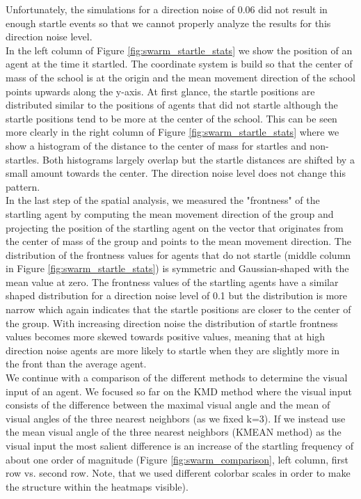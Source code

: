     Unfortunately, the simulations for a direction noise of 0.06 did not result in enough startle events so that we cannot properly analyze the results for this direction noise level.\\
    In the left column of Figure \ref{fig:swarm_startle_stats} we show the position of an agent at the time it startled.
    The coordinate system is build so that the center of mass of the school is at the origin and the mean movement direction of the school points upwards along the y-axis.
    At first glance, the startle positions are distributed similar to the positions of agents that did not startle although the startle positions tend to be more at the center of the school.
    This can be seen more clearly in the right column of Figure \ref{fig:swarm_startle_stats} where we show a histogram of the distance to the center of mass for startles and non-startles.
    Both histograms largely overlap but the startle distances are shifted by a small amount towards the center.
    The direction noise level does not change this pattern.\\
    In the last step of the spatial analysis, we measured the "frontness" of the startling agent by computing the mean movement direction of the group and projecting the position of the startling agent on the vector that originates from the center of mass of the group and points to the mean movement direction.
    The distribution of the frontness values for agents that do not startle (middle column in Figure \ref{fig:swarm_startle_stats}) is symmetric and Gaussian-shaped with the mean value at zero.
    The frontness values of the startling agents have a similar shaped distribution for a direction noise level of 0.1 but the distribution is more narrow which again indicates that the startle positions are closer to the center of the group.
    With increasing direction noise the distribution of startle frontness values becomes more skewed towards positive values, meaning that at high direction noise agents are more likely to startle when they are slightly more in the front than the average agent.\\
    We continue with a comparison of the different methods to determine the visual input of an agent.
    We focused so far on the KMD method where the visual input consists of the difference between the maximal visual angle and the mean of visual angles of the three nearest neighbors (as we fixed k=3).
    If we instead use the mean visual angle of the three nearest neighbors (KMEAN method) as the visual input the most salient difference is an increase of the startling frequency of about one order of magnitude (Figure \ref{fig:swarm_comparison}, left column, first row vs. second row. Note, that we used different colorbar scales in order to make the structure within the heatmaps visible).
